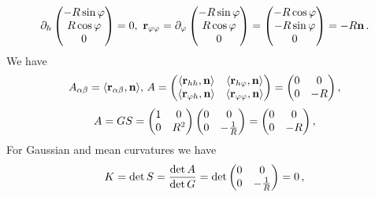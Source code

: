 \documentclass[12pt]{article}
\theoremstyle{theorem}
\numberwithin{equation}{section}
\begin{document}
             $$
             \partial_h
       \begin{pmatrix}
        -R\sin\varphi\\
        R\cos\varphi\\
          0\\
   \end{pmatrix}=0,\,\,
   {\bf r}_{\varphi \varphi}=\partial_\varphi
       \begin{pmatrix}
        -R\sin\varphi\\
        R\cos\varphi\\
          0\\
   \end{pmatrix}=\begin{pmatrix}
        -R\cos\varphi\\
        -R\sin\varphi\\
          0\\
   \end{pmatrix}=-R{\bf n}\,.
                      $$
We have
                    \begin{equation}\label{secquadrformforcylinder}
            A_{\alpha\beta}=\langle{\bf r}_{\alpha\beta},{\bf n}\rangle,\,
              A=\begin{pmatrix}\langle{\bf r}_{hh},{\bf n}\rangle&\langle{\bf r}_{h\varphi},{\bf n}\rangle\cr
                               \langle{\bf r}_{\varphi h},{\bf n}\rangle &\langle{\bf r}_{\varphi\varphi},{\bf n}\rangle\cr
                                   \end{pmatrix}=
                                   \begin{pmatrix}0&0\cr
                                0&-R\cr
                                   \end{pmatrix},
                    \end{equation}
                    $$
       A=GS=\begin{pmatrix}1&0\cr
                                0&R^2\cr
                                   \end{pmatrix}
                                   \begin{pmatrix}0&0\cr
                                0&-{1\over R}\cr
                                   \end{pmatrix}=
                                   \begin{pmatrix}0&0\cr
                                0&-R\cr
                                   \end{pmatrix},
                    $$
For Gaussian and mean curvatures we have
     \begin{equation}\label{Gaussianforcylinder}
        K=\det S={\det A\over \det G}=\det
                              \begin{pmatrix}0&0\cr
                                0&-{1\over R}\cr
                                   \end{pmatrix}=0\,,
     \end{equation}
\end{document}
